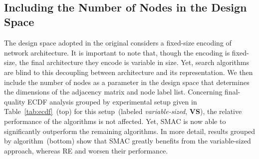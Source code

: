 \begin{table}[!t]
    \centering
        \caption{ECDF analysis grouped by experimental setup~(top) and algorithm~(bottom). O: original; VS: variable-sized; C: caching; CVS: caching \& variable-sized. Best-ranked levels are highlighted when statistically different than the others. Values in parentheses are multiplied by $10^{4}$.}
    \label{tab:ecdf}

    \\[1em]
    \quad
    \end{table}

\subsection{Including the Number of Nodes in the Design Space}
The design space adopted in the original \nasbench considers a fixed-size encoding of
network architecture. It is important to note that, though the encoding is fixed-size, 
the final architecture they encode is variable in size. Yet, search algorithms are blind to this 
decoupling between architecture and its representation. We then include the number of
nodes as a parameter in the design space that determines the dimensions of
the adjacency matrix and node label list. Concerning final-quality ECDF analysis grouped by
experimental setup given in Table~\ref{tab:ecdf}~(top) for this setup~(labeled \textit{variable-sized}, \textbf{VS}), the relative performance of the algorithms is not affected. Yet, SMAC is now able to significantly outperform the remaining algorithms. In more detail, results grouped by algorithm~(bottom) show that SMAC greatly benefits from the variable-sized approach, whereas RE and \irace worsen their performance. 

